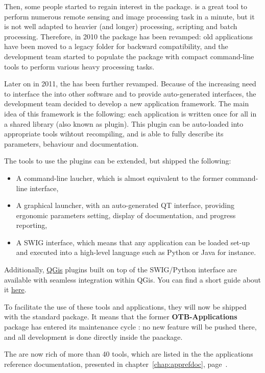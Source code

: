 Then, some people started to regain interest in the \app
package. \mont is a great tool to perform numerous remote sensing and
image processing task in a minute, but it is not well adapted to
heavier (and longer) processing, scripting and batch
processing. Therefore, in 2010 the \app package has been revamped: old
applications have been moved to a legacy folder for backward
compatibility, and the development team started to populate the
package with compact command-line tools to perform various heavy
processing tasks. 

Later on in 2011, the \app has been further revamped. Because of the
increasing need to interface the \app into other software and to
provide auto-generated interfaces, the \otb development team decided
to develop a new application framework. The main idea of this
framework is the following: each application is written once for all
in a shared library (also known as plugin). This plugin can be
auto-loaded into appropriate tools wihtout recompiling, and is able to
fully describe its parameters, behaviour and documentation.

The tools to use the plugins can be extended, but \otb shipped the
following:
\begin{itemize}
\item A command-line laucher, which is almost equivalent to the former
  \app command-line interface,
\item A graphical launcher, with an auto-generated QT interface,
  providing ergonomic parameters setting, display of documentation,
  and progress reporting,
\item A SWIG interface, which means that any application can be
  loaded set-up and executed into a high-level language such as Python
  or Java for instance.
\end{itemize}

Additionally, \href{http://www.qgis.org/}{QGis} plugins built on top of the SWIG/Python interface
are available with seamless integration within QGis. You can find a short guide about it \href{http://wiki.orfeo-toolbox.org/index.php/Quantum_GIS_access_to_OTB_applications}{here}.

To facilitate the use of these tools and applications, they will now
be shipped with the standard \otb package. It means that the former
\textbf{OTB-Applications} package has entered its maintenance cycle :
no new feature will be pushed there, and all development is done directly
inside the \otb paackage.

The \app are now rich of more than 40 tools, which are listed in the
the applications reference documentation, presented in
chapter~\ref{chap:apprefdoc}, page~\pageref{chap:apprefdoc}.

